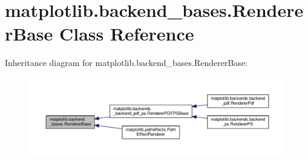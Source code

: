 \hypertarget{classmatplotlib_1_1backend__bases_1_1RendererBase}{}\section{matplotlib.\+backend\+\_\+bases.\+Renderer\+Base Class Reference}
\label{classmatplotlib_1_1backend__bases_1_1RendererBase}


Inheritance diagram for matplotlib.\+backend\+\_\+bases.\+Renderer\+Base\+:
\nopagebreak
\begin{figure}[H]
\begin{center}
\leavevmode
\includegraphics[width=350pt]{classmatplotlib_1_1backend__bases_1_1RendererBase__inherit__graph}
\end{center}
\end{figure}
